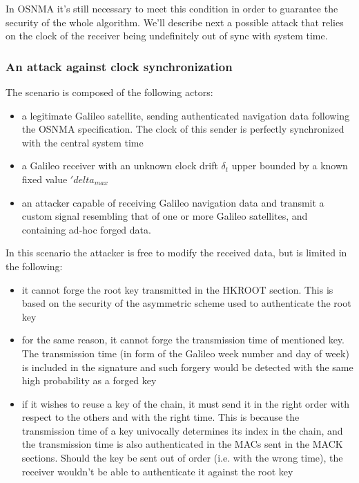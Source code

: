 In OSNMA it's still necessary to meet this condition in order to guarantee the
security of the whole algorithm. We'll describe next a possible attack that
relies on the clock of the receiver being undefinitely out of sync with system
time.

\subsubsection{An attack against clock synchronization}
The scenario is composed of the following actors:
\begin{itemize}
  \item a legitimate Galileo satellite, sending authenticated navigation data
    following the OSNMA specification. The clock of this sender is perfectly
    synchronized with the central system time
  \item a Galileo receiver with an unknown clock drift $\delta_t$ upper bounded
    by a known fixed value $'delta_{max}$
  \item an attacker capable of receiving Galileo navigation data and transmit a
    custom signal resembling that of one or more Galileo satellites, and
    containing ad-hoc forged data.
\end{itemize}

In this scenario the attacker is free to modify the received data, but is
limited in the following:
\begin{itemize}
  \item it cannot forge the root key transmitted in the HKROOT section. This is
    based on the security of the asymmetric scheme used to authenticate the root
    key
  \item for the same reason, it cannot forge the transmission time of mentioned
    key. The transmission time (in form of the Galileo week number and day of
    week) is included in the signature and such forgery would be detected with
    the same high probability as a forged key
  \item if it wishes to reuse a key of the chain, it must send it in the right
    order with respect to the others and with the right time. This is because
    the transmission time of a key univocally determines its index in the chain,
    and the transmission time is also authenticated in the MACs sent in the
    MACK sections. Should the key be sent out of order (i.e. with the wrong
    time), the receiver wouldn't be able to authenticate it against the root key
\end{itemize}

